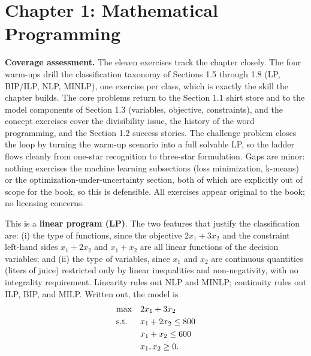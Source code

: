 \section{Chapter 1: Mathematical Programming}

\textbf{Coverage assessment.} The eleven exercises track the chapter closely. The four warm-ups drill the classification taxonomy of Sections 1.5 through 1.8 (LP, BIP/ILP, NLP, MINLP), one exercise per class, which is exactly the skill the chapter builds. The core problems return to the Section 1.1 shirt store and to the model components of Section 1.3 (variables, objective, constraints), and the concept exercises cover the divisibility issue, the history of the word programming, and the Section 1.2 success stories. The challenge problem closes the loop by turning the warm-up scenario into a full solvable LP, so the ladder flows cleanly from one-star recognition to three-star formulation. Gaps are minor: nothing exercises the machine learning subsections (loss minimization, k-means) or the optimization-under-uncertainty section, both of which are explicitly out of scope for the book, so this is defensible. All exercises appear original to the book; no licensing concerns.


This is a \textbf{linear program (LP)}. The two features that justify the classification are: (i) the type of functions, since the objective $2x_1 + 3x_2$ and the constraint left-hand sides $x_1 + 2x_2$ and $x_1 + x_2$ are all linear functions of the decision variables; and (ii) the type of variables, since $x_1$ and $x_2$ are continuous quantities (liters of juice) restricted only by linear inequalities and non-negativity, with no integrality requirement. Linearity rules out NLP and MINLP; continuity rules out ILP, BIP, and MILP. Written out, the model is
\begin{align*}
\max \quad & 2x_1 + 3x_2\\
\text{s.t.}\;\; \quad & x_1 + 2x_2 \leq 800\\
& x_1 + x_2 \leq 600\\
& x_1, x_2 \geq 0.
\end{align*}

